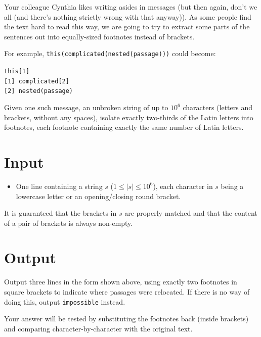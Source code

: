 
Your colleague Cynthia likes writing asides in messages (but then again,
    don't we all (and there's nothing strictly wrong with that anyway)). As
some people find the text hard to read this way, we are going to try to
extract some parts of the sentences out into equally-sized footnotes instead
of brackets.

For example, \texttt{this(complicated(nested(passage)))} could become:

\indent \texttt{this[1]} \\
\indent \texttt{[1] complicated[2]} \\
\indent \texttt{[2] nested(passage)}

Given one such message, an unbroken string of up to $10^6$ characters
(letters and brackets, without any spaces), isolate exactly
two-thirds of the Latin letters into footnotes, each footnote containing
exactly the same number of Latin letters.

\section*{Input}

\begin{itemize}
  \item One line containing a string $s$ ($1 \le |s| \le 10^6$), each character
        in $s$ being a lowercase letter or an opening/closing round bracket.
\end{itemize}

It is guaranteed that the brackets in $s$ are properly matched and that the
content of a pair of brackets is always non-empty.

\section*{Output}

Output three lines in the form shown above, using exactly two footnotes in
square brackets to indicate where passages were relocated. If there is no way of
doing this, output \texttt{impossible} instead.

Your answer will be tested by substituting the footnotes back (inside brackets)
and comparing character-by-character with the original text.
